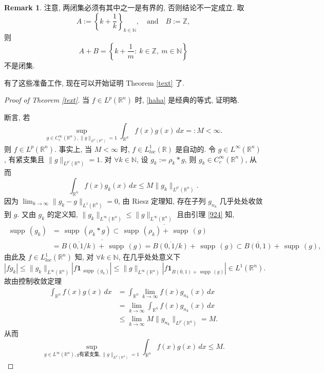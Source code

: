 \documentclass[a4paper,11pt]{article}
\theoremstyle{definition}
\newtheorem{remark}[theorem]{Remark}
\def \supp {\mathop\mathrm{\,supp\,}}
\begin{document}
\begin{remark}
    注意, 两闭集必须有其中之一是有界的, 否则结论不一定成立.
    取 
    $$ 
        A := \left\{ k + \frac{1}{k} \right\}_{k \in \mathbb{N}}, 
        \quad \text{and} \quad 
        B := \mathbb{Z},
    $$ 
    则
    $$
        A + B = \left\{ k + \frac{1}{m}:\ k \in \mathbb{Z},\ m \in \mathbb{N} \right\}
    $$
    不是闭集.
\end{remark}

有了这些准备工作, 现在可以开始证明 Theorem \ref{text} 了.

\begin{proof}[Proof of Theorem \ref{text}]
    当 $ f \in L^p(\mathbb{R}^n) $ 时, \eqref{haha} 是经典的等式, 证明略.
    
    断言, 若
    $$
        \sup_{g \in C_c^\infty(\mathbb{R}^n), \| g \|_{L^{p'}(\mathbb{R}^n)} = 1} 
            \int_{\mathbb{R}^n} f(x) g(x) \, dx =: M < \infty.
    $$
    则 $ f \in L^p(\mathbb{R}^n) $.
    事实上, 当 $ M < \infty $ 时, $ f \in L_{loc}^1(\mathbb{R}) $ 是自动的.
    令 $ g \in L^\infty(\mathbb{R}^n) $, 有紧支集且 $ \| g \|_{L^{p'}(\mathbb{R}^n)} = 1 $.
    对 $ \forall k \in \mathbb{N} $, 设 $ g_k := \rho_k * g $, 则 $ g_k \in C_c^\infty(\mathbb{R}^n) $,
    从而
    $$
        \int_{\mathbb{R}^n} f(x) g_k(x) \, dx \leq M \| g_k \|_{L^{p'}(\mathbb{R}^n)}.
    $$
    因为 $ \lim_{k \to \infty} \| g_k - g \|_{L^1(\mathbb{R}^n)} = 0 $, 由 Riesz 定理知, 
    存在子列 $ g_{n_k} $ 几乎处处收敛到 $ g $. 又由 $ g_k $ 的定义知, 
    $ \|g_k\|_{L^\infty(\mathbb{R}^n)} \leq \|g\|_{L^\infty(\mathbb{R}^n)} $ 
    且由引理 \ref{924} 知,
    \begin{align*}
        \supp(g_k) &= \supp(\rho_k * g) 
                   \subset \overline{\supp(\rho_k) + \supp(g)} \\
                   &= \overline{\overline{B(0, 1/k)} + \supp(g)} 
                   = \overline{B(0, 1/k)} + \supp(g)
                   \subset \overline{B(0, 1)} + \supp(g), 
    \end{align*}
    由此及 $ f \in L^1_{loc}(\mathbb{R}^n) $ 知, 
    对 $ \forall k \in \mathbb{N} $, 在几乎处处意义下
    $$
        |f g_k| \leq \|g_k\|_{L^\infty(\mathbb{R}^n)} |f \mathbf{1}_{\supp(g_k)}|
                \leq \|g\|_{L^\infty(\mathbb{R}^n)} \left|f \mathbf{1}_{\overline{B(0, 1)} + \supp(g)}\right| 
                \in L^1(\mathbb{R}^n).
    $$
    故由控制收敛定理
    \begin{align*}
        \int_{\mathbb{R}^n} f(x) g(x) \, dx
            &= \int_{\mathbb{R}^n} \lim_{k \to \infty} f(x) g_{n_k}(x) \, dx \\
            &= \lim_{k \to \infty} \int_{\mathbb{R}^n} f(x) g_{n_k}(x) \, dx \\
            &\leq \lim_{k \to \infty} M \| g_{n_k} \|_{L^{p'}(\mathbb{R}^n)}
            = M.
    \end{align*}
    从而
    $$
        \sup_{g \in L^\infty(\mathbb{R}^n), g \text{有紧支集}, \| g \|_{L^{p'}(\mathbb{R}^n)} = 1} 
            \int_{\mathbb{R}^n} f(x) g(x) \, dx \leq M.
    $$
    

\end{proof}
\end{document}
